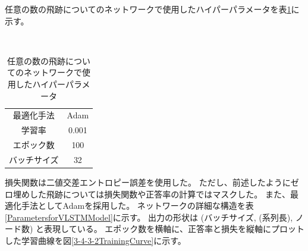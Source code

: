 任意の数の飛跡についてのネットワークで使用したハイパーパラメータを表\ref{HyperparametersforVLSTMModel}に示す。

\begin{table}[htb]
 \centering
　\small
  \begin{tabular}{c c}\hline
    最適化手法 & Adam\\
    学習率 & 0.001\\
    エポック数 & 100\\
    バッチサイズ & 32\\\hline
  \end{tabular}
  \caption{任意の数の飛跡についてのネットワークで使用したハイパーパラメータ}
  \label{HyperparametersforVLSTMModel}
\end{table}

損失関数は二値交差エントロピー誤差を使用した。
ただし、前述したようにゼロ埋めした飛跡については損失関数や正答率の計算ではマスクした。
また、最適化手法としてAdamを採用した。
ネットワークの詳細な構造を表\ref{ParametersforVLSTMModel}に示す。
出力の形状は (バッチサイズ, (系列長), ノード数) と表現している。
エポック数を横軸に、正答率と損失を縦軸にプロットした学習曲線を図\ref{3-4-3-2TrainingCurve}に示す。



